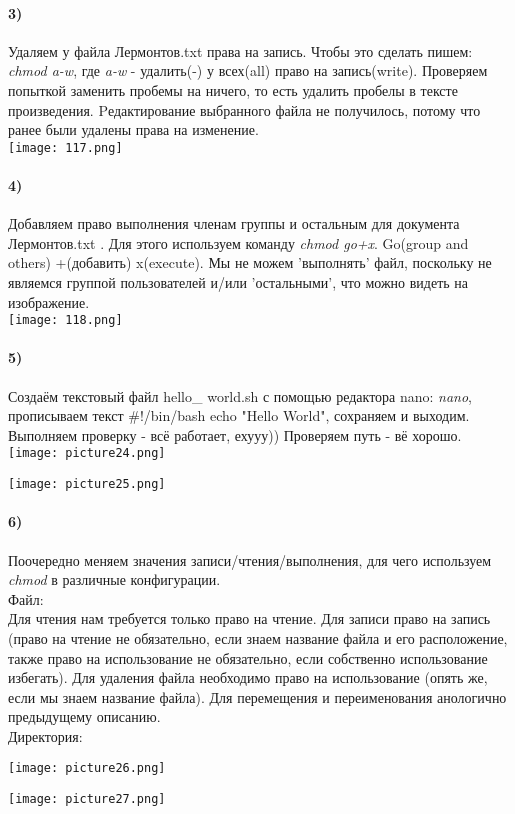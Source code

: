 		\paragraph{3)}
		Удаляем у файла Лермонтов.txt права на запись. Чтобы это сделать пишем: 		\textit{chmod a-w}, где \textit{a-w} - удалить(-) у всех(all) право на 				запись(write). Проверяем попыткой заменить пробемы на ничего, то есть удалить 		пробелы в тексте произведения. Pедактирование выбранного файла не получилось, потому что ранее были удалены права на изменение. \\
	\texttt{[image: 117.png]}
	\\
	
		\paragraph{4)}
		Добавляем право выполнения членам группы и остальным  для документа 			Лермонтов.txt . Для этого используем команду \textit{chmod go+x}. Go(group and 		others) +(добавить) x(execute). Мы не можем 'выполнять' файл, поскольку не являемся группой пользователей и/или 'остальными', что можно видеть на изображение. \\
	\texttt{[image: 118.png]}
	\\
		\paragraph{5)}
		Создаём текстовый файл hello\_ world.sh с помощью редактора nano: 				\textit{nano}, прописываем текст \#!/bin/bash echo "Hello World", сохраняем и 		выходим. Выполняем проверку - всё работает, ехууу)) Проверяем путь - вё хорошо.		\\
	\texttt{[image: picture24.png]}
	\begin{center}
		\texttt{[image: picture25.png]}
	\end{center}
	
		\paragraph{6)}
		Поочередно меняем значения записи/чтения/выполнения, для чего используем 		\textit{chmod} в различные конфигурации. \\
		Файл: \\
		Для чтения нам требуется только право на чтение. Для записи право на запись (право на чтение не обязательно, если знаем название файла и его расположение, также право на использование не обязательно, если собственно использование избегать). Для удаления файла необходимо право на использование (опять же, если мы знаем название файла). Для перемещения и переименования анологично предыдущему описанию.\\
		Директория:\\
		
		\begin{center}
			\texttt{[image: picture26.png]}
		\end{center}
		\vspace{0.1cm}
		\begin{center}
			\texttt{[image: picture27.png]}
		\end{center}


	  
	  
	  
		
